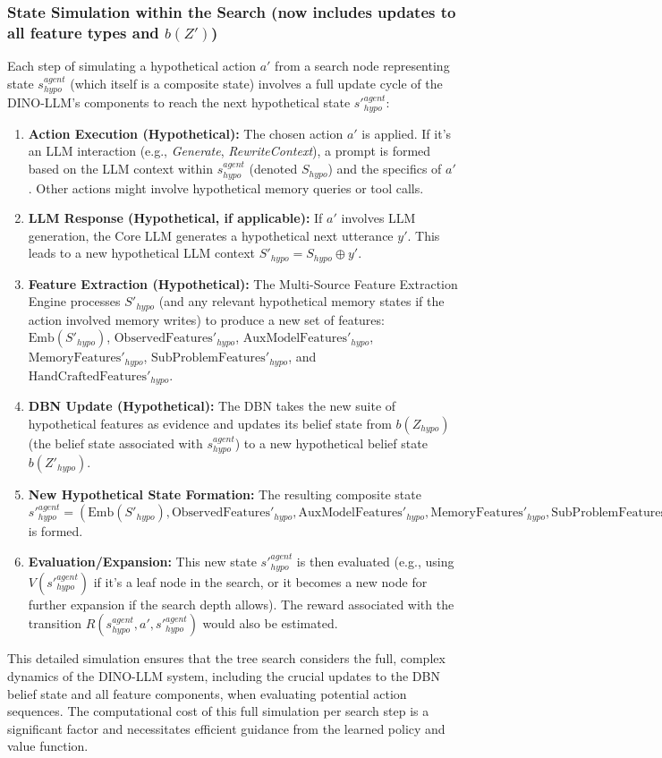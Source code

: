 \documentclass[11pt]{article}
\begin{document}
\subsubsection{State Simulation within the Search (now includes updates to all feature types and $b(Z')$)}
\label{sssec:tree_search_simulation}
Each step of simulating a hypothetical action $a'$ from a search node representing state $s_{hypo}^{agent}$ (which itself is a composite state) involves a full update cycle of the DINO-LLM's components to reach the next hypothetical state $s'^{agent}_{hypo}$:
\begin{enumerate}
    \item \textbf{Action Execution (Hypothetical):} The chosen action $a'$ is applied. If it's an LLM interaction (e.g., \emph{Generate}, \emph{RewriteContext}), a prompt is formed based on the LLM context within $s_{hypo}^{agent}$ (denoted $S_{hypo}$) and the specifics of $a'$. Other actions might involve hypothetical memory queries or tool calls.
    \item \textbf{LLM Response (Hypothetical, if applicable):} If $a'$ involves LLM generation, the Core LLM generates a hypothetical next utterance $y'$. This leads to a new hypothetical LLM context $S'_{hypo} = S_{hypo} \oplus y'$.
    \item \textbf{Feature Extraction (Hypothetical):} The Multi-Source Feature Extraction Engine processes $S'_{hypo}$ (and any relevant hypothetical memory states if the action involved memory writes) to produce a new set of features: $\text{Emb}(S'_{hypo})$, $\text{ObservedFeatures}'_{hypo}$, $\text{AuxModelFeatures}'_{hypo}$, $\text{MemoryFeatures}'_{hypo}$, $\text{SubProblemFeatures}'_{hypo}$, and $\text{HandCraftedFeatures}'_{hypo}$.
    \item \textbf{DBN Update (Hypothetical):} The DBN takes the new suite of hypothetical features as evidence and updates its belief state from $b(Z_{hypo})$ (the belief state associated with $s_{hypo}^{agent}$) to a new hypothetical belief state $b(Z'_{hypo})$.
    \item \textbf{New Hypothetical State Formation:} The resulting composite state $s'^{agent}_{hypo} = (\text{Emb}(S'_{hypo}), \text{ObservedFeatures}'_{hypo}, \text{AuxModelFeatures}'_{hypo}, \text{MemoryFeatures}'_{hypo}, \text{SubProblemFeatures}'_{hypo}, \text{HandCraftedFeatures}'_{hypo}, b(Z'_{hypo}))$ is formed.
    \item \textbf{Evaluation/Expansion:} This new state $s'^{agent}_{hypo}$ is then evaluated (e.g., using $V(s'^{agent}_{hypo})$ if it's a leaf node in the search, or it becomes a new node for further expansion if the search depth allows). The reward associated with the transition $R(s_{hypo}^{agent}, a', s'^{agent}_{hypo})$ would also be estimated.
\end{enumerate}
This detailed simulation ensures that the tree search considers the full, complex dynamics of the DINO-LLM system, including the crucial updates to the DBN belief state and all feature components, when evaluating potential action sequences. The computational cost of this full simulation per search step is a significant factor and necessitates efficient guidance from the learned policy and value function.
\end{document}
